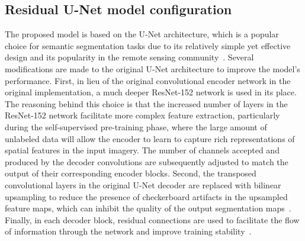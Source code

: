 




\subsection{Residual U-Net model configuration}

The proposed model is based on the U-Net architecture, which is a popular choice for semantic segmentation tasks due to its relatively simple yet effective design and its popularity in the remote sensing community~\cite{ronnebergerUNetConvolutionalNetworks2015d, robinsonLargeScaleHighresolution2019, panDeepLearningSegmentation2020, liDeepUNetDeepFully2018}.
Several modifications are made to the original U-Net architecture to improve the model's performance.
First, in lieu of the original convolutional encoder network in the original implementation, a much deeper ResNet-152 network is used in its place.
The reasoning behind this choice is that the increased number of layers in the ResNet-152 network facilitate more complex feature extraction, particularly during the self-supervised pre-training phase, where the large amount of unlabeled data will allow the encoder to learn to capture rich representations of spatial features in the input imagery.
The number of channels accepted and produced by the decoder convolutions are subsequently adjusted to match the output of their corresponding encoder blocks.
Second, the transposed convolutional layers in the original U-Net decoder are replaced with bilinear upsampling to reduce the presence of checkerboard artifacts in the upsampled feature maps, which can inhibit the quality of the output segmentation maps~\cite{odenaDeconvolutionCheckerboardArtifacts2016, sanjarImprovedUNetFully2020}.
Finally, in each decoder block, residual connections are used to facilitate the flow of information through the network and improve training stability~\cite{heDeepResidualLearning2015b}.


